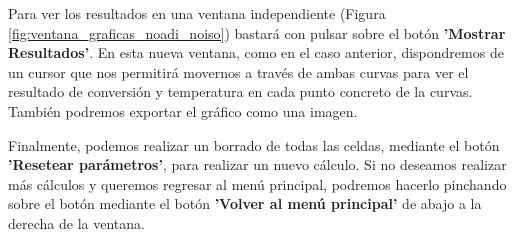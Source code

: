 Para ver los resultados en una ventana independiente (Figura \ref{fig:ventana_graficas_noadi_noiso}) bastará con pulsar sobre el botón \textbf{'Mostrar Resultados'}. En esta nueva ventana, como en el caso anterior, dispondremos de un cursor que nos permitirá movernos a través de ambas curvas para ver el resultado de conversión y temperatura en cada punto concreto de la curvas. También podremos exportar el gráfico como una imagen.

Finalmente, podemos realizar un borrado de todas las celdas, mediante el botón \textbf{'Resetear parámetros'}, para realizar un nuevo cálculo. Si no deseamos realizar más cálculos y queremos regresar al menú principal, podremos hacerlo pinchando sobre el botón mediante el botón \textbf{'Volver al menú principal'} de abajo a la derecha de la ventana.